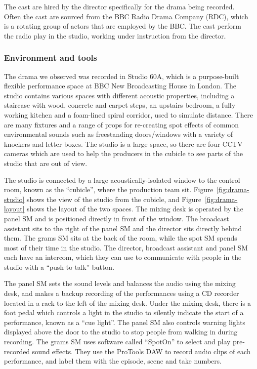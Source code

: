 The cast are hired by the director specifically for the drama being recorded. Often the cast are sourced from the BBC
Radio Drama Company (RDC), which is a rotating group of actors that are employed by the BBC. The cast perform the
radio play in the studio, working under instruction from the director.

\subsubsection{Environment and tools}
The drama we observed was recorded in Studio 60A, which is a purpose-built flexible performance space at BBC New
Broadcasting House in London. The studio contains various spaces with different acoustic properties, including a
staircase with wood, concrete and carpet steps, an upstairs bedroom, a fully working kitchen and a foam-lined spiral
corridor, used to simulate distance.  There are many fixtures and a range of props for re-creating spot effects of
common environmental sounds such as freestanding doors/windows with a variety of knockers and letter boxes. The studio
is a large space, so there are four CCTV cameras which are used to help the producers in the cubicle to see parts of
the studio that are out of view. 

The studio is connected by a large acoustically-isolated window to the control room, known as the ``cubicle'', where
the production team sit.  Figure~\ref{fig:drama-studio} shows the view of the studio from the cubicle, and
Figure~\ref{fig:drama-layout} shows the layout of the two spaces. The mixing desk is operated by the panel SM and is
positioned directly in front of the window.  The broadcast assistant sits to the right of the panel SM and the director
sits directly behind them. The grams SM sits at the back of the room, while the spot SM spends most of their time in
the studio.  The director, broadcast assistant and panel SM each have an intercom, which they can use to communicate
with people in the studio with a ``push-to-talk'' button.

The panel SM sets the sound levels and balances the audio using the mixing desk, and makes a backup recording of the
performances using a CD recorder located in a rack to the left of the mixing desk.  Under the mixing desk, there is a
foot pedal which controls a light in the studio to silently indicate the start of a performance, known as a ``cue
light''. The panel SM also controls warning lights displayed above the door to the studio to stop people from walking
in during recording.  The grams SM uses software called ``SpotOn'' \citep{Cridford2005} to select and play pre-recorded
sound effects. They use the ProTools DAW to record audio clips of each performance, and label them with the episode,
scene and take numbers.

